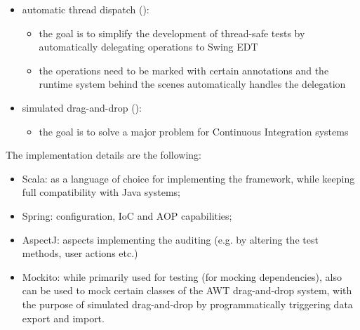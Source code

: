 \begin{itemize}
\item automatic thread dispatch ():
	\begin{itemize}
	\item the goal is to simplify the development of thread-safe tests by automatically delegating operations to Swing EDT
	\item the operations need to be marked with certain annotations and the runtime system behind the scenes automatically handles the delegation
	\end{itemize}

\item simulated drag-and-drop ():
	\begin{itemize}
	\item the goal is to solve a major problem for Continuous Integration systems
	\end{itemize}
\end{itemize}

\noindent The implementation details are the following:

\begin{itemize}
\item Scala: as a language of choice for implementing the framework, while keeping full compatibility with Java systems;
\item Spring: configuration, IoC and AOP capabilities;
\item AspectJ: aspects implementing the auditing (e.g. by altering the test methods, user actions etc.)
\item Mockito: while primarily used for testing (for mocking dependencies), also can be used to mock certain classes of the AWT drag-and-drop system, with the purpose of simulated drag-and-drop by programmatically triggering data export and import.
\end{itemize}
